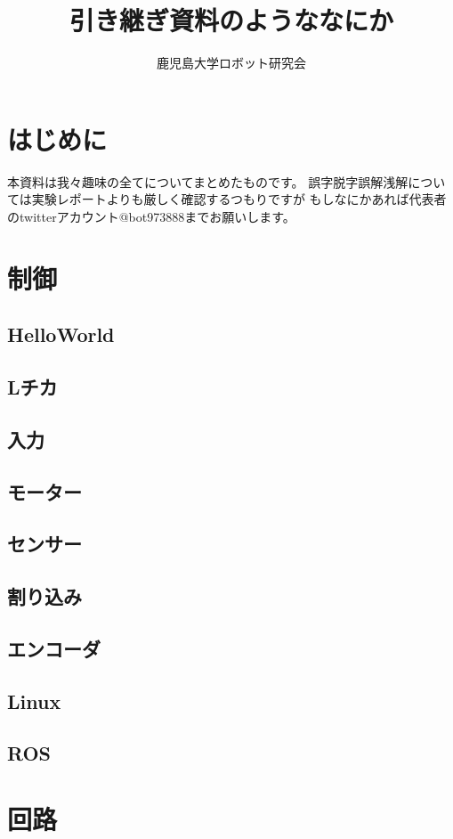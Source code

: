 \documentclass{jarticle}
\begin{document}
\title{引き継ぎ資料のようななにか}
\author{鹿児島大学ロボット研究会}

\maketitle

\tableofcontents
\clearpage

\section{はじめに}
本資料は我々趣味の全てについてまとめたものです。
誤字脱字誤解浅解については実験レポートよりも厳しく確認するつもりですが
もしなにかあれば代表者のtwitterアカウント@bot973888までお願いします。
\section{制御}
   \subsection{HelloWorld}
   \subsection{Lチカ}
   \subsection{入力}
   \subsection{モーター}
   \subsection{センサー}
   \subsection{割り込み}
   \subsection{エンコーダ}
   \subsection{Linux}
   \subsection{ROS}
\section{回路}
\end{document}

